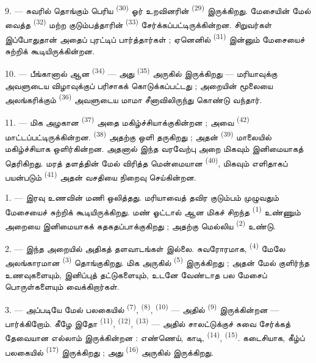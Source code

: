 9. --- சுவரில் தொங்கும் பெரிய 
\textsuperscript{(30)} ஓர் உறவினரின் 
\textsuperscript{(29)} இருக்கிறது. மேசையின் மேல் வைத்த  \textsuperscript{(32)} மற்ற குடும்பத்தாரின்
 \textsuperscript{(33)} சேர்க்கப்பட்டிருக்கின்றன.
சிறுவர்கள் இப்போதுதான் அதைப் புரட்டிப் பார்த்தார்கள் ; ஏனெனில்
 \textsuperscript{(31)} இன்னும் மேசையைச் சுற்றிக்
கூடியிருக்கின்றன.

10. --- பீங்கானால் ஆன  \textsuperscript{(34)} — அது
 \textsuperscript{(35)} அருகில் இருக்கிறது —
மரியாவுக்கு அவளுடைய விழாவுக்குப் பரிசாகக் கொடுக்கப்பட்டது ; அறையின்
மூலையை அலங்கரிக்கும்  \textsuperscript{(36)}
அவளுடைய மாமா சீனாவிலிருந்து கொண்டு வந்தார்.

11. --- மிக அழகான  \textsuperscript{(37)} அதை
மகிழ்ச்சியாக்குகின்றன ; அவை  \textsuperscript{(42)}
மாட்டப்பட்டிருக்கின்றன. 
\textsuperscript{(38)} அதற்கு ஒளி தருகிறது ; அதன் 
\textsuperscript{(39)} மாலையில் மகிழ்ச்சியாக ஒளிர்கின்றன. அதனால் இந்த
வரவேற்பு அறை மிகவும் இனிமையாகத் தெரிகிறது. மரத் தளத்தின் மேல் விரித்த
மென்மையான  \textsuperscript{(40)}, மிகவும் எளிதாகப்
பயன்படும்  \textsuperscript{(41)} அதன் வசதியை
நிறைவு செய்கின்றன.

\VUsaut{3.6mm}
\VUsaut{3.0mm}

1. --- இரவு உணவின் மணி ஒலித்தது. மரியாவைத் தவிர குடும்பம் முழுவதும்
மேசையைச் சுற்றிக் கூடியிருக்கிறது. மண் ஓட்டால் ஆன மிகச் சிறந்த
 \textsuperscript{(1)} உண்ணும் அறையை இனிமையாகக்
கதகதப்பாக்குகிறது ; அதற்கு மெல்லிய 
\textsuperscript{(2)} உண்டு.

2. --- இந்த அறையில் அதிகத் தளவாடங்கள் இல்லை. சுவரோரமாக,
 \textsuperscript{(4)} மேலே அலங்காரமான  \textsuperscript{(3)} தொங்குகிறது. மிக அருகில்
 \textsuperscript{(5)} இருக்கிறது ; அதன் மேல்
குளிர்ந்த உணவுகளையும், இனிப்புத் தட்டுகளையும், உடனே வேண்டாத பல மேசைப்
பொருள்களையும் வைக்கிறார்கள்.

3. --- அப்படியே மேல் பலகையில் 
\textsuperscript{(7)},  \textsuperscript{(8)},
 \textsuperscript{(10)} — அதில் 
\textsuperscript{(9)} இருக்கின்றன — பார்க்கிறோம். கீழே இதோ
 \textsuperscript{(11)}, 
\textsuperscript{(12)},  \textsuperscript{(13)} —
அதில் சாலட்டுக்குச் சுவை சேர்க்கத் தேவையான எல்லாம் இருக்கின்றன :
எண்ணெய், காடி,  \textsuperscript{(14)}, 
\textsuperscript{(15)}. கடைசியாக, கீழ்ப் பலகையில் 
\textsuperscript{(17)} இருக்கிறது ; அது 
\textsuperscript{(16)} அருகில் இருக்கிறது.

